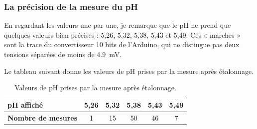 \subsubsection*{La précision de la mesure du pH}

En regardant les valeurs une par une, je remarque que le pH ne prend que quelques valeurs bien précises : 5,26, 5,32, 5,38, 5,43 et 5,49. Ces « marches » sont la trace du convertisseur 10 bits de l'Arduino, qui ne distingue pas deux tensions séparées de moins de \qty{4,9}{mV}.

Le tableau suivant donne les valeurs de pH prises par la mesure après étalonnage.

\begin{table}[H]
\centering
\small
\begin{tabular}{|l|c|c|c|c|c|}
\hline
\textbf{pH affiché} & 5,26 & 5,32 & 5,38 & 5,43 & 5,49 \\
\hline
\textbf{Nombre de mesures} & 1 & 15 & 50 & 46 & 7 \\
\hline
\end{tabular}
\caption{Valeurs de pH prises par la mesure après étalonnage.}
\end{table}

